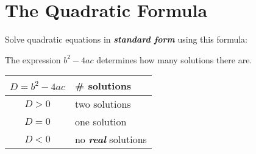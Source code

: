 \section{The Quadratic Formula}

Solve quadratic equations in {\bfseries\itshape standard form} 
using this formula:


\hfill 
\begin{minipage}{0.4\textwidth}
The expression $b^2-4ac$ determines {how many} solutions there are.
\end{minipage}
\hfill 
\begin{minipage}{0.55\textwidth}
\begin{center}
    \begin{tabular}{cl}
        \toprule
        $D = b^2-4ac$ & \# solutions \\
        \midrule
        $D > 0$ & two solutions \\
        $D = 0$ & one solution \\
        $D < 0$ & no {\bfseries\itshape real} solutions \\
        \bottomrule
    \end{tabular}
\end{center}
\end{minipage}
\hfill{}
